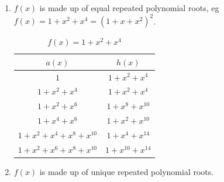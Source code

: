 \documentclass[11pt, oneside, dvipdfmx]{book}
\begin{document}
\begin{enumerate}
\item $f(x)$ is made up of equal repeated polynomial roots, eg $f(x)=1+x^2+x^4=(1+x+x^2)^2$.

\begin{table}[h!]
 \caption{$f(x)=1+x^2+x^4$}
\centering
 \begin{tabular}{c c} 
 \hline
 $a(x)$ & $h(x)$ \\ [0.5ex] 
 \hline\hline
$1$ & $1+x^2+x^4$\\
\hline
$1+x^2+x^4$  & $1+x^2+x^4$\\
\hline
$1+x^2+x^6$  & $1+x^8+x^{10}$\\
\hline
$1+x^4+x^6$  & $1+x^2+x^{10}$\\
\hline
$1+x^2+x^4+x^8+x^{10}$  & $1+x^4+x^{14}$\\
\hline
$1+x^2+x^{6}+x^{8}+x^{10}$  & $1+x^{10}+x^{14}$\\
 \end{tabular}
 \label{Tab8}
\end{table}

\item  $f(x)$ is made up of unique repeated polynomial roots.
\end{enumerate}	
		
\end{document}
